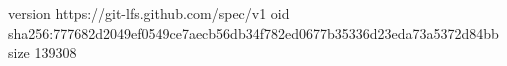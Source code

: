version https://git-lfs.github.com/spec/v1
oid sha256:777682d2049ef0549ce7aecb56db34f782ed0677b35336d23eda73a5372d84bb
size 139308
